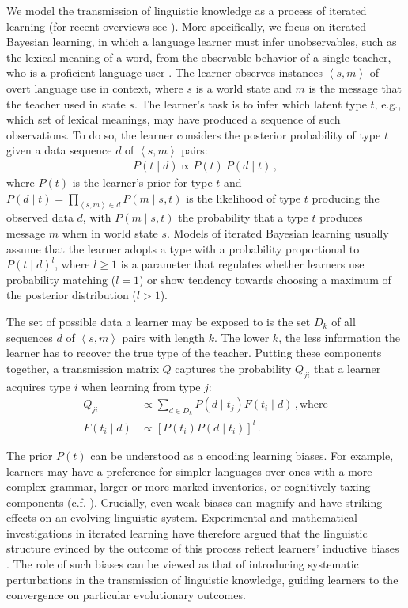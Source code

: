 \documentclass[10pt,a4paper]{article}
\newcommand{\tuple}[1]{\ensuremath{\left\langle #1 \right\rangle}}
\begin{document}
We model the transmission of linguistic knowledge as a process of iterated learning (for recent
overviews see \citealt{kirby+etal:2014, tamariz+kirby:2016}). More specifically, we focus on
iterated Bayesian learning, in which a language learner must infer unobservables, such as the
lexical meaning of a word, from the observable behavior of a single teacher, who is a
proficient language user \citep[e.g.][]{griffiths+kalish:2007,kirby+etal:2007}. The learner
observes instances $\tuple{s,m}$ of overt language use in context, where $s$ is a world state
and $m$ is the message that the teacher used in state $s$. The learner's task is to infer which
latent type $t$, e.g., which set of lexical meanings, may have produced a sequence of such
observations. To do so, the learner considers the posterior probability of type $t$ given a
data sequence $d$ of $\tuple{s, m}$ pairs:
\begin{align*}
  P(t \mid d) \propto P(t) \ P(d \mid t)\,,
\end{align*}
where $P(t)$ is the learner's prior for type $t$ and
$P(d \mid t) = \prod_{\tuple{s,m} \in d} P(m \mid s, t)$ is the likelihood of type $t$
producing the observed data $d$, with $P(m \mid s, t)$ the probability that a type $t$ produces
message $m$ when in world state $s$. Models of iterated Bayesian learning usually assume that
the learner adopts a type with a probability proportional to $P(t \mid d)^l$, where $l \ge 1$
is a parameter that regulates whether learners use probability matching ($l = 1$) or show
tendency towards choosing a maximum of the posterior distribution ($l > 1$). 

The set of possible data a learner may be exposed to is the set $D_k$ of all sequences $d$  of $\tuple{s,m}$ pairs with
length $k$. The lower $k$, the less information the learner has to
recover the true type of the teacher. Putting these components together, a transmission matrix $Q$ captures the probability $Q_{ji}$
that a learner acquires type $i$ when learning from type $j$:
\begin{align*}
  Q_{ji} &\propto \sum_{d \in D_k} P(d \mid t_j) F(t_i \mid d)\,, \text{where} \\
  F(t_i \mid d) &\propto [P(t_i) P(d \mid t_i)]^l\,.
\end{align*}


The prior $P(t)$ can be understood as a encoding learning biases. For example, learners may
have a preference for simpler languages over ones with a more complex grammar, larger or more
marked inventories, or cognitively taxing components
(c.f. \citealt{feldman:2000,chater+vitanyi:2003, kirby+etal:2015}). Crucially, even weak biases
can magnify and have striking effects on an evolving linguistic system. Experimental and
mathematical investigations in iterated learning have therefore argued that the linguistic
structure evinced by the outcome of this process reflect learners' inductive biases
\citep{kirby+etal:2007,kirby+etal:2014}. The role of such biases can be viewed as that of
introducing systematic perturbations in the transmission of linguistic knowledge, guiding
learners to the convergence on particular evolutionary outcomes.
\end{document}
